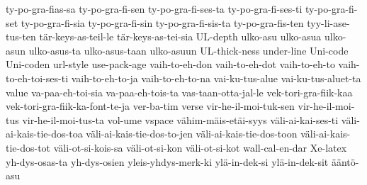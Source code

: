 {  ty-po-gra-fias-sa
  ty-po-gra-fi-sen
  ty-po-gra-fi-ses-ta
  ty-po-gra-fi-ses-ti
  ty-po-gra-fi-set
  ty-po-gra-fi-sia
  ty-po-gra-fi-sin
  ty-po-gra-fi-sis-ta
  ty-po-gra-fis-ten
  tyy-li-ase-tus-ten
  tär-keys-as-teil-le
  tär-keys-as-tei-sia
  UL-depth
  ulko-asu
  ulko-asua
  ulko-asun
  ulko-asus-ta
  ulko-asus-taan
  ulko-asuun
  UL-thick-ness
  under-line
  Uni-code
  Uni-coden
  url-style
  use-pack-age
  vaih-to-eh-don
  vaih-to-eh-dot
  vaih-to-eh-to
  vaih-to-eh-toi-ses-ti
  vaih-to-eh-to-ja
  vaih-to-eh-to-na
  vai-ku-tus-alue
  vai-ku-tus-aluet-ta
  value
  va-paa-eh-toi-sia
  va-paa-eh-tois-ta
  vas-taan-otta-jal-le
  vek-tori-gra-fiik-kaa
  vek-tori-gra-fiik-ka-font-te-ja
  ver-ba-tim
  verse
  vir-he-il-moi-tuk-sen
  vir-he-il-moi-tus
  vir-he-il-moi-tus-ta
  vol-ume
  vspace
  vähim-mäis-etäi-syys
  väli-ai-kai-ses-ti
  väli-ai-kais-tie-dos-toa
  väli-ai-kais-tie-dos-to-jen
  väli-ai-kais-tie-dos-toon
  väli-ai-kais-tie-dos-tot
  väli-ot-si-kois-sa
  väli-ot-si-kon
  väli-ot-si-kot
  wall-cal-en-dar
  Xe-latex
  yh-dys-osas-ta
  yh-dys-osien
  yleis-yhdys-merk-ki
  ylä-in-dek-si
  ylä-in-dek-sit
  ääntö-asu
}
